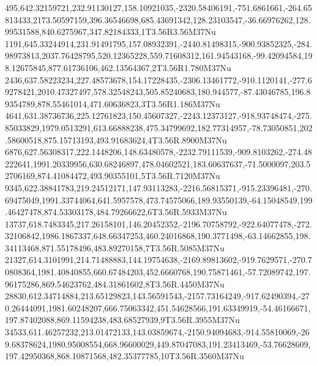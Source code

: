 495,642.32159721,232.91130127,158.10921035,-2320.58406191,-751.6861661,-264.65813433,2173.50597159,396.36546698,685.43691342,128.23103547,-36.66976262,128.99531588,840.6275967,347.82184333,1T3.56R3.56M37Nu
1191,645.33244914,231.91491795,157.08932391,-2440.81498315,-900.93852325,-284.98973813,2037.76428795,520.12365228,559.71608312,161.94543168,-99.42094584,198.12675845,877.61736106,462.13564367,2T3.56R1.780M37Nu
2436,637.58223234,227.48573678,154.17228435,-2306.13461772,-910.1120141,-277.69278421,2010.47327497,578.32548243,505.85240683,180.944577,-87.43046785,196.89354789,878.55461014,471.60636823,3T3.56R1.186M37Nu
4641,631.38736736,225.12761823,150.45607327,-2243.12373127,-918.93748474,-275.85033829,1979.0513291,613.66888238,475.34799692,182.77314957,-78.73050851,202.58600518,875.15713193,493.91683624,4T3.56R.8900M37Nu
6876,627.56308317,222.1448206,148.63480578,-2232.79111539,-909.8103262,-274.48222641,1991.20339956,630.68246897,478.04602521,183.60637637,-71.5000097,203.52706169,874.41084472,493.90355101,5T3.56R.7120M37Nu
9345,622.38841783,219.24512171,147.93113283,-2216.56815371,-915.23396481,-270.69475049,1991.33744064,641.5957578,473.74575066,189.93550139,-64.15048549,199.46427478,874.53303178,484.79266622,6T3.56R.5933M37Nu
13737,618.7483345,217.26158101,146.20452352,-2196.70758792,-922.64077478,-272.32106842,1986.1867337,648.66347253,460.24016868,190.3771498,-63.14662855,198.34113468,871.55178496,483.89270158,7T3.56R.5085M37Nu
21327,614.3101991,214.71488883,144.19754638,-2169.89813602,-919.7629571,-270.70808364,1981.40840855,660.67484203,452.6660768,190.75871461,-57.72089742,197.96175286,869.54623762,484.31861602,8T3.56R.4450M37Nu
28830,612.34714884,213.65129823,143.56591543,-2157.73164249,-917.62490394,-270.26444091,1981.60248207,666.75063342,451.54628566,191.63349919,-54.46166671,197.87402088,869.11594238,483.68527939,9T3.56R.3955M37Nu
34533,611.46257232,213.01472133,143.03859674,-2150.94094683,-914.55810069,-269.68378624,1980.95008554,668.96600029,449.87047083,191.23413469,-53.76628609,197.42950368,868.10871568,482.35377785,10T3.56R.3560M37Nu
